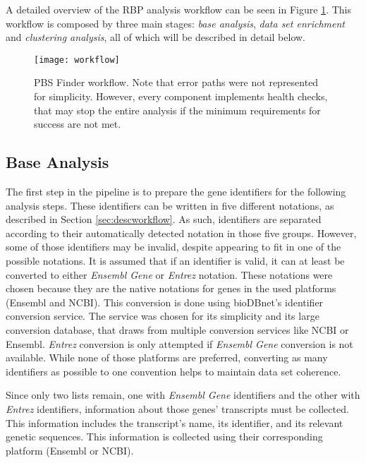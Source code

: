 A detailed overview of the RBP analysis workflow can be seen in Figure
\ref{fig:workflow}. This workflow is composed by three main stages: \emph{base
analysis}, \emph{data set enrichment} and \emph{clustering analysis}, all of
which will be described in detail below.

\begin{figure}[!htb]
  \begin{center}
    \leavevmode
    \texttt{[image: workflow]}
    \caption[PBS Finder workflow]{
      PBS Finder workflow. Note that error paths were not represented for
      simplicity. However, every component implements health checks, that may
      stop the entire analysis if the minimum requirements for success are not
      met.
    }
    \label{fig:workflow}
  \end{center}
\end{figure}

\subsection{Base Analysis}

The first step in the pipeline is to prepare the gene identifiers for the
following analysis steps. These identifiers can be written in five different
notations, as described in Section \ref{sec:descworkflow}. As such, identifiers
are separated according to their automatically detected notation in those five
groups. However, some of those identifiers may be invalid, despite appearing to
fit in one of the possible notations. It is assumed that if an identifier is
valid, it can at least be converted to either \emph{Ensembl Gene} or
\emph{Entrez} notation. These notations were chosen because they are the native
notations for genes in the used platforms (Ensembl and NCBI). This conversion is
done using bioDBnet's \cite{Mudunuri15022009} identifier conversion service. The
service was chosen for its simplicity and its large conversion database, that
draws from multiple conversion services like NCBI or Ensembl. \emph{Entrez}
conversion is only attempted if \emph{Ensembl Gene} conversion is not available.
While none of those platforms are preferred, converting as many identifiers as
possible to one convention helps to maintain data set coherence.

Since only two lists remain, one with \emph{Ensembl Gene} identifiers and the
other with \emph{Entrez} identifiers, information about those genes' transcripts
must be collected. This information includes the transcript's name, its
identifier, and its relevant genetic sequences. This information is collected
using their corresponding platform (Ensembl or NCBI).

